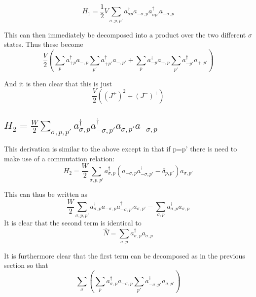 \documentclass[11pt]{article} %
\begin{document}
\begin{equation}
H_1=\frac{1}{2}V \sum_{\sigma,p,p'} a_{\sigma p}^\dagger a_{-\sigma, p} a_{\sigma p'}^\dagger a_{-\sigma, p} 
\end{equation}



This can then immediately be decomposed into a product over the two different $\sigma$ states. Thus these become\\

\begin{equation} 
\frac{V}{2}\left(\sum_p a_{+ p}^\dagger a_{-, p} \sum_{p'} a_{+ p'}^\dagger a_{-, p'}  +\sum_p a_{- p}^\dagger a_{+, p} \sum_{p'} a_{- p'}^\dagger a_{+, p'}\right)
\end{equation}

And it is then clear that this is just\\

\begin{equation}
\frac{V}{2}\left((J^+)^2+(J^-)^+\right)
\end{equation}

\subsection{$H_2=\frac{W}{2}\sum_{\sigma,p,p'}a_{\sigma,p}^\dagger a_{-\sigma,p'}^\dagger a_{\sigma,p'} a_{-\sigma,p}$}


This derivation is similar to the above except in that if p=p' there is  need to make use of a commutation relation:\\

\begin{equation}
H_2=\frac{W}{2}\sum_{\sigma,p,p'}a_{\sigma,p}^\dagger \left(a_{-\sigma,p}
 a_{-\sigma,p'}^\dagger -\delta_{p,p'}\right) a_{\sigma,p'} 
\end{equation}

This can thus be written as
\begin{equation}
 \frac{W}{2}\sum_{\sigma,p,p'}a_{\sigma,p}^\dagger a_{-\sigma,p}
 a_{-\sigma,p'}^\dagger a_{\sigma,p'}  -\sum_{\sigma,p}a_{\sigma,p}^\dagger a_{\sigma,p}
\end{equation}
It is clear that the second term is identical to
\begin{equation}
\hat{N}=\sum_{\sigma,p}a_{\sigma,p}^\dagger a_{\sigma,p}
\end{equation} 

It is furthermore clear that the first term can be decomposed as in the previous section so that
\begin{equation}
 \sum_\sigma \left(\sum_{p}a_{\sigma,p}^\dagger a_{-\sigma,p}
 \sum_{p'}a_{-\sigma,p'}^\dagger a_{\sigma,p'} \right)
\end{equation}
\end{document}
